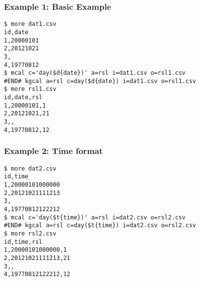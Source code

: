 \subsubsection*{Example 1: Basic Example}



\begin{Verbatim}[baselinestretch=0.7,frame=single]
$ more dat1.csv
id,date
1,20000101
2,20121021
3,
4,19770812
$ mcal c='day($d{date})' a=rsl i=dat1.csv o=rsl1.csv
#END# kgcal a=rsl c=day($d{date}) i=dat1.csv o=rsl1.csv
$ more rsl1.csv
id,date,rsl
1,20000101,1
2,20121021,21
3,,
4,19770812,12
\end{Verbatim}
\subsubsection*{Example 2: Time format}



\begin{Verbatim}[baselinestretch=0.7,frame=single]
$ more dat2.csv
id,time
1,20000101000000
2,20121021111213
3,
4,19770812122212
$ mcal c='day($t{time})' a=rsl i=dat2.csv o=rsl2.csv
#END# kgcal a=rsl c=day($t{time}) i=dat2.csv o=rsl2.csv
$ more rsl2.csv
id,time,rsl
1,20000101000000,1
2,20121021111213,21
3,,
4,19770812122212,12
\end{Verbatim}
